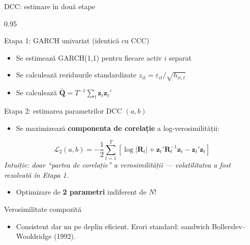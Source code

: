 \documentclass[9pt, aspectratio=169, t]{beamer}
\begin{document}
\begin{frame}{DCC: estimare în două etape}
    \begin{cminipage}{0.95\textwidth}
    \vspace{-2mm}
    {\scriptsize
    \begin{block}{Etapa 1: GARCH univariat (identică cu CCC)}
        \begin{itemize}\setlength{\itemsep}{0pt}
            \item Se estimează GARCH(1,1) pentru fiecare activ $i$ separat
            \item Se calculează reziduurile standardizate $z_{it} = \varepsilon_{it}/\sqrt{h_{ii,t}}$
            \item Se calculează $\bar{\mathbf{Q}} = T^{-1}\sum_t \mathbf{z}_t\mathbf{z}_t'$
        \end{itemize}
    \end{block}
    \vspace{-1mm}
    \begin{block}{Etapa 2: estimarea parametrilor DCC $(a, b)$}
        \begin{itemize}\setlength{\itemsep}{0pt}
            \item Se maximizează \textbf{componenta de corelație} a log-verosimilității:
        \end{itemize}
        \vspace{-2mm}
        \[
            \mathcal{L}_2(a,b) = -\frac{1}{2}\sum_{t=1}^T \left[ \log|\mathbf{R}_t| + \mathbf{z}_t'\mathbf{R}_t^{-1}\mathbf{z}_t - \mathbf{z}_t'\mathbf{z}_t \right]
        \]
        \vspace{-3mm}
        \textit{Intuiție: doar ``partea de corelație'' a verosimilității --- volatilitatea a fost rezolvată în Etapa 1.}
        \begin{itemize}\setlength{\itemsep}{0pt}
            \item Optimizare de \textbf{2 parametri} indiferent de $N$!
        \end{itemize}
    \end{block}
    \vspace{-1mm}
    \begin{alertblock}{Verosimilitate compozită}
        \begin{itemize}\setlength{\itemsep}{0pt}
            \item Consistent dar nu pe deplin eficient. Erori standard: sandwich Bollerslev--Wooldridge (1992).
        \end{itemize}
    \end{alertblock}
    }
    \end{cminipage}
\end{frame}
\end{document}
